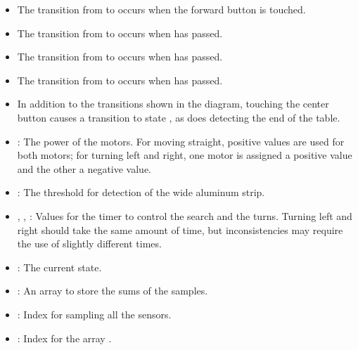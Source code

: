 \begin{itemize}

\item The transition from  to  occurs when
the forward button is touched.

\item The transition from  to  occurs
when  has passed.

\item The transition from  to  occurs
when  has passed.

\item The transition from  to  occurs
when  has passed.

\item In addition to the transitions shown in the diagram,
touching the center button causes a transition to state ,
as does detecting the end of the table.
\end{itemize}


\begin{itemize}

\item {}: The power of the motors. For moving straight,
positive values are used for both motors; for turning left and right,
one motor is assigned a positive value and the other a negative value.

\item {}: The threshold for detection of the wide aluminum strip.

\item {}, , : Values for
the timer to control the search and the turns.
Turning left and right should take the same amount of time,
but inconsistencies may require the use of slightly different times.

\end{itemize}


\begin{itemize}
\item {}: The current state. 
\item {}: An array to store the sums of the samples.
\item {}: Index for sampling all the sensors.
\item {}: Index for the array .
\end{itemize}

